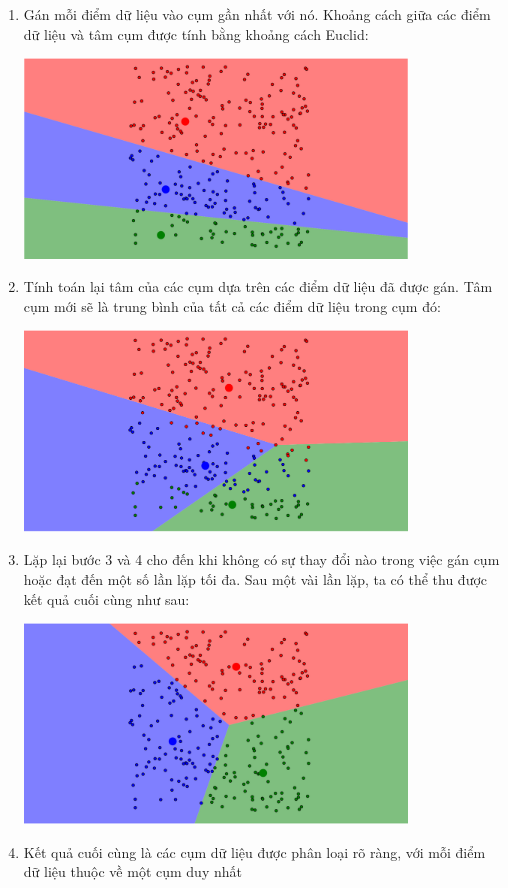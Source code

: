 \begin{enumerate}
	\item Gán mỗi điểm dữ liệu vào cụm gần nhất với nó. Khoảng cách giữa các điểm dữ liệu và tâm cụm được tính bằng khoảng cách Euclid:
	      \begin {center}
	      \includegraphics[width=0.8\textwidth]{images/KMeanStep/3.PNG}
	      \end{center}
	\item Tính toán lại tâm của các cụm dựa trên các điểm dữ liệu đã được gán. Tâm cụm mới sẽ là trung bình của tất cả các điểm dữ liệu trong cụm đó:
	      \begin{center}
		      \includegraphics[width=0.8\textwidth]{images/KMeanStep/4.PNG}
	      \end{center}
	\item Lặp lại bước 3 và 4 cho đến khi không có sự thay đổi nào trong việc gán cụm hoặc đạt đến một số lần lặp tối đa. Sau một vài lần lặp, ta có thể thu được kết quả cuối cùng như sau:
	      \begin {center}
	      \includegraphics[width=0.8\textwidth]{images/KMeanStep/5.PNG}
	      \end{center}
	\item Kết quả cuối cùng là các cụm dữ liệu được phân loại rõ ràng, với mỗi điểm dữ liệu thuộc về một cụm duy nhất

\end{enumerate}

